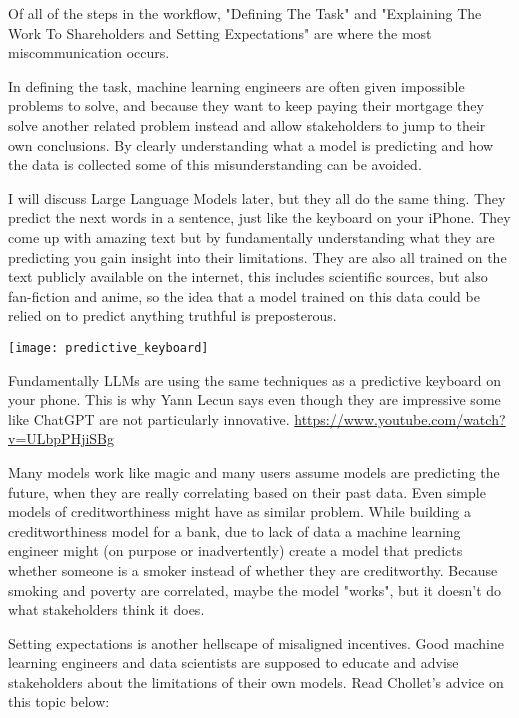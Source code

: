 Of all of the steps in the workflow, "Defining The Task" and "Explaining The Work To Shareholders and Setting Expectations" are where the most miscommunication occurs. 

In defining the task, machine learning engineers are often given impossible problems to solve, and because they want to keep paying their mortgage they solve another related problem instead and allow stakeholders to jump to their own conclusions. By clearly understanding what a model is predicting and how the data is collected some of this misunderstanding can be avoided.

I will discuss Large Language Models later, but they all do the same thing. They predict the next words in a sentence, just like the keyboard on your iPhone. They come up with amazing text but by fundamentally understanding what they are predicting you gain insight into their limitations. They are also all trained on the text publicly available on the internet, this includes scientific sources, but also fan-fiction and anime, so the idea that a model trained on this data could be relied on to predict anything truthful is preposterous. 

\begin{marginfigure}[-5.5cm]
        \texttt{[image: predictive\_keyboard]}
        \caption{Fundamentally LLMs are using the same techniques as a predictive keyboard on your phone. This is why Yann Lecun says even though they are impressive some like ChatGPT are not particularly innovative. \url{https://www.youtube.com/watch?v=ULbpPHjiSBg}}
\end{marginfigure}

Many models work like magic and many users assume models are predicting the future, when they are really correlating based on their past data. Even simple models of creditworthiness might have as similar problem. While building a creditworthiness model for a bank, due to lack of data a machine learning engineer might (on purpose or inadvertently) create a model that predicts whether someone is a smoker instead of whether they are creditworthy. Because smoking and poverty are correlated, maybe the model "works", but it doesn't do what stakeholders think it does. 

Setting expectations is another hellscape of misaligned incentives. Good machine learning engineers and data scientists are supposed to educate and advise stakeholders about the limitations of their own models. Read Chollet's advice on this topic below:

